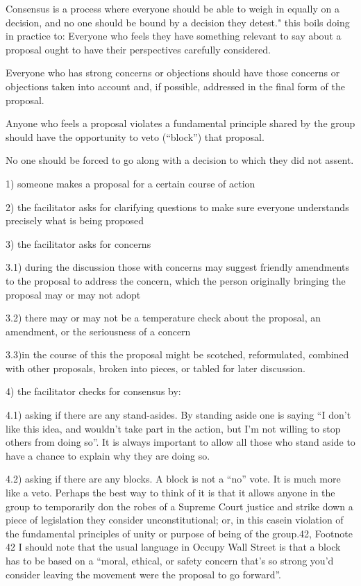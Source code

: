 \documentclass{article}
\begin{document}
Consensus is a process where everyone should be able to weigh in equally on a decision, and no one should be bound by a decision they detest."
this boils doing in practice to: Everyone who feels they have something relevant to say about a proposal ought to have their perspectives carefully considered.

Everyone who has strong concerns or objections should have those concerns or objections taken into account and, if possible, addressed in the final form of the proposal.

Anyone who feels a proposal violates a fundamental principle shared by the group should have the opportunity to veto (“block”) that proposal.

No one should be forced to go along with a decision to which they did not assent.

1) someone makes a proposal for a certain course of action

2) the facilitator asks for clarifying questions to make sure everyone understands precisely what is being proposed

3) the facilitator asks for concerns

3.1) during the discussion those with concerns may suggest friendly amendments to the proposal to address the concern, which the person originally bringing the proposal may or may not adopt

3.2) there may or may not be a temperature check about the proposal, an amendment, or the seriousness of a concern

3.3)in the course of this the proposal might be scotched, reformulated, combined with other proposals, broken into pieces, or tabled for later discussion.

4) the facilitator checks for consensus by:

4.1) asking if there are any stand-asides. By standing aside one is saying “I don’t like this idea, and wouldn’t take part in the action, but I’m not willing to stop others from doing so”. It is always important to allow all those who stand aside to have a chance to explain why they are doing so.

4.2) asking if there are any blocks. A block is not a “no” vote. It is much more like a veto. Perhaps the best way to think of it is that it allows anyone in the group to temporarily don the robes of a Supreme Court justice and strike down a piece of legislation they consider unconstitutional; or, in this casein violation of the fundamental principles of unity or purpose of being of the group.{42},
Footnote {42} I should note that the usual language in Occupy Wall Street is that a block has to be based on a “moral, ethical, or safety concern that’s so strong you’d consider leaving the movement were the proposal to go forward”.
\end{document}
